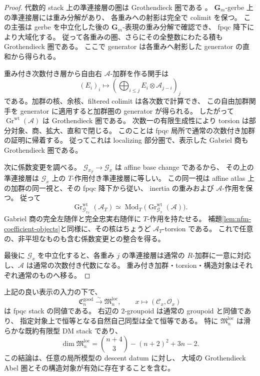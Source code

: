 \begin{proof}
代数的 stack 上の準連接層の圏は Grothendieck 圏である
\cite[Proposition~96.15.2, Tag~0781]{NFMStacksQCohGrothendieck}。
$\mathbf G_m$-gerbe 上の準連接層には重み分解があり、
各重みへの射影は完全で colimit を保つ。
この主張は gerbe を中立化した後の $\mathbf G_m$-表現の重み分解で確認でき、
fpqc 降下により大域化する。
従って各重みの圏、さらにその全整数にわたる積も Grothendieck 圏である。
ここで generator は各重みへ射影した generator の直和から得られる。

重み付き次数付き層から自由右 $\mathcal A$-加群を作る関手は
\[
 (E_i)_i\longmapsto
 \left(\bigoplus_{i\le j}E_i\otimes\mathcal A_{j-i}\right)_j
\]
である。加群の核、余核、filtered colimit は各次数で計算でき、
この自由加群関手を generator に適用すると加群圏の generator が得られる。
したがって $\operatorname{Gr}^{\mathrm{wt}}(\mathcal A)$ は Grothendieck 圏である。
次数一の有限生成性により torsion は部分対象、商、拡大、直和で閉じる。
このことは fpqc 局所で通常の次数付き加群の証明に帰着する。
従ってこれは localizing 部分圏で、表示した Gabriel 商も Grothendieck 圏である。

次に係数変更を調べる。
$\mathcal G_{x_T}\to\mathcal G_x$ は affine base change であるから、
その上の準連接層は $\mathcal G_x$ 上の $T$-作用付き準連接層に等しい。
この同一視は affine atlas 上の加群の同一視と、その fpqc 降下から従い、
inertia の重みおよび $\mathcal A$-作用を保つ。
従って
\[
 \operatorname{Gr}^{\mathrm{wt}}_{\mathcal G_{x_T}}(\mathcal A_T)
 \simeq\operatorname{Mod}_T
 \bigl(\operatorname{Gr}^{\mathrm{wt}}_{\mathcal G_x}(\mathcal A)\bigr).
\]
Gabriel 商の完全左随伴と完全忠実右随伴に $T$-作用を持たせる。
補題\ref{lem:nfm-coefficient-objects}と同様に、その核はちょうど
$\mathcal A_T$-torsion である。
これで任意の、非平坦なものも含む係数変更との整合を得る。

最後に $\mathcal G_x$ を中立化すると、各重み $j$ の準連接層は通常の
$R$-加群に一意に対応し、$\mathcal A$ は通常の次数付き代数になる。
重み付き加群・torsion・構造対象はそれぞれ通常のものへ移る。
\end{proof}

\begin{theorem}
\label{thm:nfm-local-moduli}
上記の良い表示の入力の下で、
\[
 \mathfrak C_n^{\mathrm{good}}
 \xrightarrow{\ \sim\ }
 \mathfrak M_n^{\mathrm{loc}},\qquad
 x\longmapsto(\mathcal C_x,\mathcal O_x)
\]
は fpqc stack の同値である。
右辺の $2$-groupoid は通常の groupoid と同値であり、
指定対象上で恒等となる自然自己同型は全て恒等である。
特に $\mathfrak M_n^{\mathrm{loc}}$ は滑らかな既約有限型 DM stack であり、
\[
 \dim\mathfrak M_n^{\mathrm{loc}}
 =\binom{n+4}{3}-(n+2)^2+3n-2.
\]
この結論は、任意の局所模型の descent datum に対し、
大域の Grothendieck Abel 圏とその構造対象が有効に存在することを含む。
\end{theorem}

